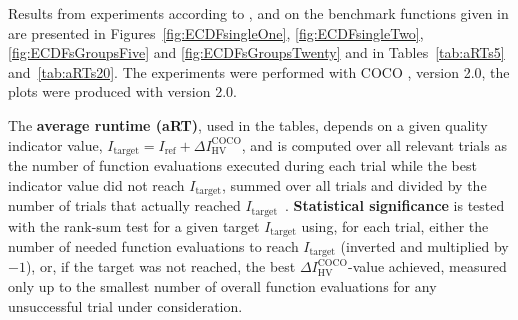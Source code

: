 \documentclass[sigconf]{acmart}
\newcommand{\DI}{\ensuremath{\Delta I_{\mathrm{HV}}^{\mathrm{COCO}}}}
\newcommand{\Itarget}{\ensuremath{I_\mathrm{target}}}
\newcommand{\hvref}{\ensuremath{I_\mathrm{ref}}}
\newcommand{\change}[1]{{\color{red} #1}}
\begin{document}
Results from experiments according to \cite{hansen2016exp},
\cite{hansen2016perfass} and \cite{biobj2016perfass} on the benchmark
functions given in \cite{biobj2016func} are presented in
Figures~\ref{fig:ECDFsingleOne}, \ref{fig:ECDFsingleTwo}, \ref{fig:ECDFsGroupsFive} and
\ref{fig:ECDFsGroupsTwenty} and in Tables~\ref{tab:aRTs5} and~\ref{tab:aRTs20}.
The experiments were performed with COCO \cite{hansen2016cocoplat}, version
\change{2.0}, the plots were produced with version \change{2.0}.

The \textbf{average runtime (aRT)}, used in the %
tables,
depends on a given quality indicator value, $\Itarget=\hvref+\DI$, and is
computed over all relevant trials as the number of function
evaluations executed during each trial while the best indicator value
did not reach \Itarget, summed over all trials and divided by the
number of trials that actually reached \Itarget\
\cite{hansen2016exp,price1997dev}.  \textbf{Statistical significance}
is tested with the rank-sum test for a given target $\Itarget$
using, for each trial,
either the number of needed function evaluations to reach
$\Itarget$ (inverted and multiplied by $-1$), or, if the target
was not reached, the best $\DI$-value achieved, measured only up to
the smallest number of overall function evaluations for any
unsuccessful trial under consideration.




\end{document}
